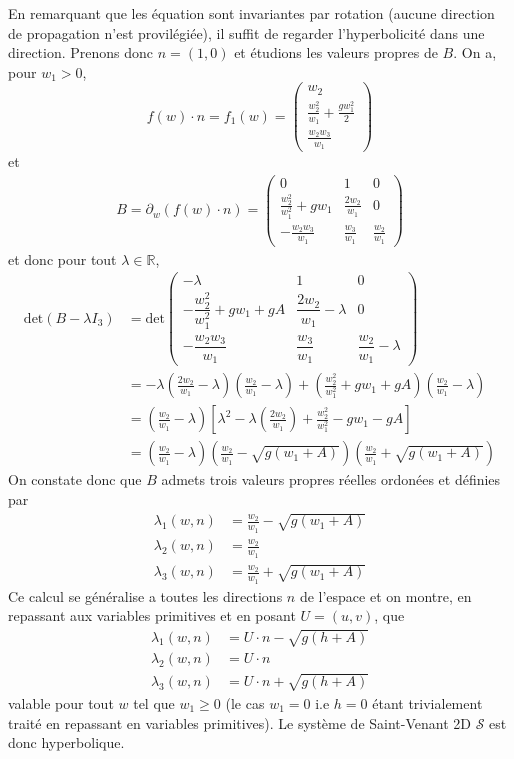 \documentclass[
	french,
	11pt, %
]{fphw}
\newcommand{\mymat}[9]{\begin{pmatrix} #1 & #2 & #3 \\ #4 & #5 & #6 \\ #7 & #8 &#9 \end{pmatrix}}  %
\renewcommand{\vector}[4]{\begin{pmatrix} #1  \\ #2 \\ #3 \end{pmatrix}}   %
\begin{document}
En remarquant que les équation sont invariantes par rotation (aucune direction de propagation n'est provilégiée), il suffit de regarder l'hyperbolicité dans une direction. Prenons donc $n=(1,0)$ et étudions les valeurs propres de $B$. On a, pour $w_1 > 0$,
$$f(w)\cdot n = f_1(w) = \vector{w_2}{\frac{w_2^2}{w_1} + \frac{gw_1^2}{2}}{\frac{w_2w_3}{w_1}}{0}$$
et 
\begin{align*}
	B = \partial_w \left( f(w)\cdot n \right) = \begin{pmatrix} 0 & 1 & 0  \\ \frac{w_2^2}{w_1^2}+gw_1 & \frac{2w_2}{w_1} & 0  \\ -\frac{w_2w_3}{w_1} & \frac{w_3}{w_1} & \frac{w_2}{w_1} \end{pmatrix}
\end{align*}
et donc pour tout $\lambda \in \mathbb{R} $,
\begin{align*}
	\text{det}(B-\lambda I_3) &= \text{det} \mymat{-\lambda}{1}{0}{-\dfrac{w_2^2}{w_1^2}+gw_1+gA}{\dfrac{2w_2}{w_1}-\lambda}{0}{-\dfrac{w_2w_3}{w_1}}{\dfrac{w_3}{w_1}}{\dfrac{w_2}{w_1}-\lambda}  \\
	&= -\lambda \left( \frac{2w_2}{w_1} -\lambda \right)\left( \frac{w_2}{w_1} -\lambda \right) + \left( \frac{w_2^2}{w_1^2} +gw_1 +gA \right)\left( \frac{w_2}{w_1} -\lambda \right)     \\
	&= \left( \frac{w_2}{w_1} -\lambda \right) \left[ \lambda^2 - \lambda \left(\frac{2w_2}{w_1}\right) + \frac{w_2^2}{w_1^2}-gw_1-gA  \right] \\
	&= \left( \frac{w_2}{w_1} -\lambda \right) \left( \frac{w_2}{w_1} - \sqrt{g(w_1 + A)} \right) \left( \frac{w_2}{w_1} + \sqrt{g(w_1 + A)} \right)
\end{align*}
On constate donc que $B$ admets trois valeurs propres réelles ordonées et définies par 
\begin{align*}
	\lambda_1(w,n) &= \frac{w_2}{w_1} - \sqrt{g(w_1 + A)} \\
	\lambda_2(w,n) &= \frac{w_2}{w_1} \\
	\lambda_3(w,n) &= \frac{w_2}{w_1} + \sqrt{g(w_1 + A)}
\end{align*}
Ce calcul se généralise a toutes les directions $n$ de l'espace et on montre, en repassant aux variables primitives et en posant $U = (u,v)$, que 
\begin{align*}
	\lambda_1(w,n) &= U\cdot n - \sqrt{g(h + A)} \\
	\lambda_2(w,n) &= U\cdot n \\
	\lambda_3(w,n) &= U\cdot n + \sqrt{g(h + A)}
\end{align*}
valable pour tout $w$ tel que $w_1 \geq 0$ (le cas $w_1 = 0$ i.e $h=0$ étant trivialement traité en repassant en variables primitives). Le système de Saint-Venant 2D $\mathcal{S}$ est donc hyperbolique.
\end{document}
